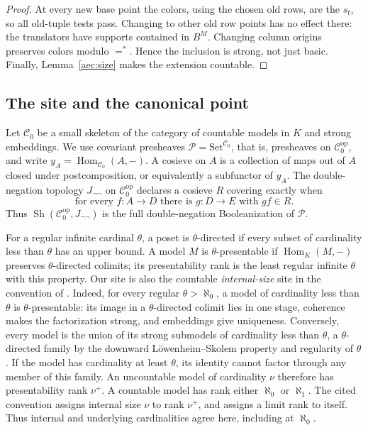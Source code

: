 \begin{proof}
At every new base point the colors, using the chosen old rows, are
the \(s_t\), so all old-tuple tests pass. Changing to other old row
points has no effect there: the translators have supports contained
in \(B^M\). Changing column origins preserves colors modulo
\(=^*\). Hence the inclusion is strong, not just basic. Finally,
Lemma~\ref{aec:size} makes the extension countable.
\end{proof}

\subsection{The site and the canonical point}

Let \(\mathcal C_0\) be a small skeleton of the category of countable
models in \(K\) and strong embeddings. We use covariant presheaves
\(\mathcal P=\mathrm{Set}^{\mathcal C_0}\), that is, presheaves on
\(\mathcal C_0^{\mathrm{op}}\), and write
\(y_A=\operatorname{Hom}_{\mathcal C_0}(A,-)\). A cosieve on \(A\)
is a collection of maps out of \(A\) closed under postcomposition,
or equivalently a subfunctor of \(y_A\). The double-negation topology
\(J_{\neg\neg}\) on \(\mathcal C_0^{\mathrm{op}}\) declares a
cosieve \(R\) covering exactly when
\begin{equation}\label{bool:density}
 \text{for every } f:A\to D\text{ there is }g:D\to E
 \text{ with }gf\in R.
\end{equation}
Thus \(\operatorname{Sh}(\mathcal C_0^{\mathrm{op}},J_{\neg\neg})\)
is the full double-negation Booleanization of \(\mathcal P\).

For a regular infinite cardinal \(\theta\), a poset is
\(\theta\)-directed if every subset of cardinality less than
\(\theta\) has an upper bound. A model \(M\) is
\(\theta\)-presentable if \(\operatorname{Hom}_K(M,-)\) preserves
\(\theta\)-directed colimits; its presentability rank is the least
regular infinite \(\theta\) with this property.
Our site is also the countable \emph{internal-size} site in the convention
of \cite[Definition~2.3 and the notation at the end of
Section~2]{Espindola2022Eventual}. Indeed, for every regular
\(\theta>\aleph_0\), a model of cardinality less than \(\theta\)
is \(\theta\)-presentable: its image in a \(\theta\)-directed
colimit lies in one stage, coherence makes the factorization strong,
and embeddings give uniqueness. Conversely, every model is the union
of its strong submodels of cardinality less than \(\theta\), a
\(\theta\)-directed family by the downward
L\"owenheim--Skolem property and regularity of \(\theta\).
If the model has cardinality at least \(\theta\), its identity
cannot factor through any member of this family. An uncountable model
of cardinality \(\nu\) therefore has presentability rank \(\nu^+\).
A countable model has rank either \(\aleph_0\) or \(\aleph_1\).
The cited convention assigns internal size \(\nu\) to rank
\(\nu^+\), and assigns a limit rank to itself. Thus internal and
underlying cardinalities agree here, including at \(\aleph_0\).

